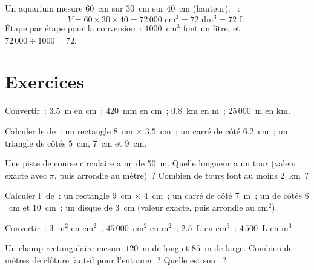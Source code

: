 \begin{example}\label{ex:g6:measure:aquarium}
Un aquarium mesure $60$~cm sur $30$~cm sur $40$~cm (hauteur).
~:
\[
V = 60 \times 30 \times 40 = 72\,000 \text{ cm}^3 = 72 \text{ dm}^3
= 72 \text{ L}.
\]
Étape par étape pour la conversion~: $1000$~cm$^3$ font un litre, et
$72\,000 \div 1000 = 72$.
\end{example}

\section{Exercices}

\begin{exercise}[$\star$]\label{exo:g6:measure:1}
Convertir~: $3.5$~m en cm~; $420$~mm en cm~; $0.8$~km en m~;
$25\,000$~m en km.
\end{exercise}

\begin{exercise}[$\star$]\label{exo:g6:measure:2}
Calculer le  de~: un rectangle $8$~cm $\times$ $3.5$~cm~; un
carré de côté $6.2$~cm~; un triangle de côtés $5$~cm, $7$~cm et
$9$~cm.
\end{exercise}

\begin{exercise}[$\star$]\label{exo:g6:measure:3}
Une piste de course circulaire a un  de $50$~m. Quelle longueur
a un tour (valeur exacte avec $\pi$, puis arrondie au mètre)~? Combien
de tours font au moins $2$~km~?
\end{exercise}

\begin{exercise}[$\star$]\label{exo:g6:measure:4}
Calculer l' de~: un rectangle $9$~cm $\times$ $4$~cm~; un carré
de côté $7$~m~; un  de côtés $6$~cm et $10$~cm~; un
disque de  $3$~cm (valeur exacte, puis arrondie au cm$^2$).
\end{exercise}

\begin{exercise}[$\star$]\label{exo:g6:measure:5}
Convertir~: $3$~m$^2$ en cm$^2$~; $45\,000$~cm$^2$ en m$^2$~;
$2.5$~L en cm$^3$~; $4\,500$~L en m$^3$.
\end{exercise}

\begin{exercise}[$\star$]\label{exo:g6:measure:6}
Un champ rectangulaire mesure $120$~m de long et $85$~m de large.
Combien de mètres de clôture faut-il pour l'entourer~? Quelle est son
~?
\end{exercise}

